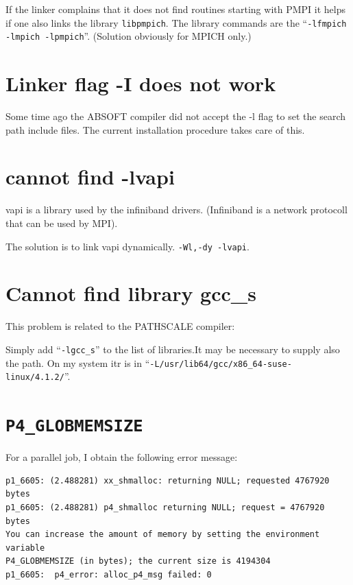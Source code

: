 \documentclass[a4paper,10pt]{report}
\newcommand{\mytt}[1]{{\tt #1}}
\begin{document}
If the linker complains that it does not find routines starting with
PMPI it helps if one also links the library \verb+libpmpich+. The
library commands are the
``\verb+-lfmpich -lmpich -lpmpich+''. (Solution obviously for MPICH
only.)

\section{Linker flag -I does not work}
Some time ago the ABSOFT compiler did not accept the -l flag to set
the search path include files. The current installation procedure
takes care of this.

\section{cannot find -lvapi}
vapi is a library used by the infiniband drivers. (Infiniband is a
network protocoll that can be used by MPI). 

The solution is to link vapi dynamically. \mytt{-Wl,-dy -lvapi}.



\section{Cannot find library gcc\_s}
This problem is related to the PATHSCALE compiler:

Simply add ``\verb+-lgcc_s+'' to the list of libraries.It may be
necessary to supply also the path. On my system itr is in
``\verb+-L/usr/lib64/gcc/x86_64-suse-linux/4.1.2/+''.

\section{\mytt{P4\_GLOBMEMSIZE}}
For a parallel job, I obtain the following error message:
\begin{verbatim}
p1_6605: (2.488281) xx_shmalloc: returning NULL; requested 4767920 bytes
p1_6605: (2.488281) p4_shmalloc returning NULL; request = 4767920 bytes
You can increase the amount of memory by setting the environment variable
P4_GLOBMEMSIZE (in bytes); the current size is 4194304
p1_6605:  p4_error: alloc_p4_msg failed: 0
\end{verbatim}
\end{document}
